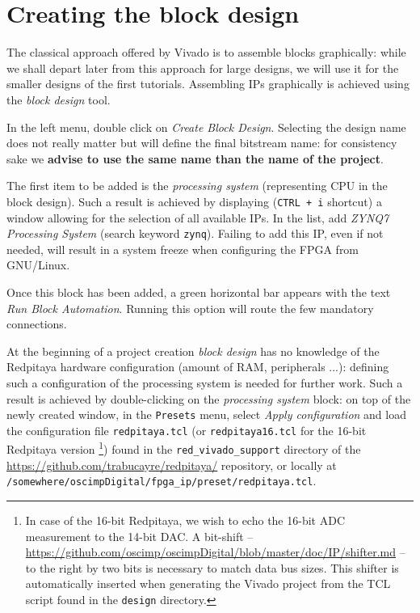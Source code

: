 \documentclass[10pt,oneside]{article}
\begin{document}
\section{Creating the block design}

The classical approach offered by Vivado is to assemble blocks graphically: while we
shall depart later from this approach for large designs, we will use it for the smaller
designs of the first tutorials. Assembling IPs graphically is achieved using the
{\em block design} tool.

In the left menu, double click on {\em Create Block Design}. Selecting the design
name does not really matter but will define the final bitstream name: for consistency
sake we {\bf advise to use the same name than the name of the project}.

The first item to be added is the {\em processing system} (representing CPU in the
block design). Such a result is achieved by displaying ({\tt CTRL + i} shortcut) a
window allowing for the selection of all available IPs. In the list, add {\em ZYNQ7 
Processing System} (search keyword {\tt zynq}). Failing to add this IP, even if not needed,
will result in a system freeze when configuring the FPGA from GNU/Linux.

Once this block has been added, a green horizontal bar appears with the text
{\em Run Block Automation}. Running this option will route the few mandatory connections.

At the beginning of a project creation {\em block design} has no knowledge of the
Redpitaya hardware configuration (amount of RAM, peripherals ...): defining such
a configuration of the processing system is needed for further work. Such a result
is achieved by double-clicking on the {\em processing system} block: on top
of the newly created window, in the {\tt Presets} menu, select {\em Apply configuration} 
and load the configuration file {\tt redpitaya.tcl} (or {\tt redpitaya16.tcl} for the
16-bit Redpitaya version
\footnote{In case of the 16-bit Redpitaya, we wish to echo the 16-bit ADC measurement to
the 14-bit DAC. A bit-shift -- \url{https://github.com/oscimp/oscimpDigital/blob/master/doc/IP/shifter.md} -- 
to the right by two bits is necessary to match data bus sizes.
This shifter is automatically inserted when generating the Vivado project from the TCL script
found in the {\tt design} directory.}) found in the {\tt red\_vivado\_support} 
directory of the \url{https://github.com/trabucayre/redpitaya/} repository, or
locally at\\
{\tt /somewhere/oscimpDigital/fpga\_ip/preset/redpitaya.tcl}.
\end{document}
